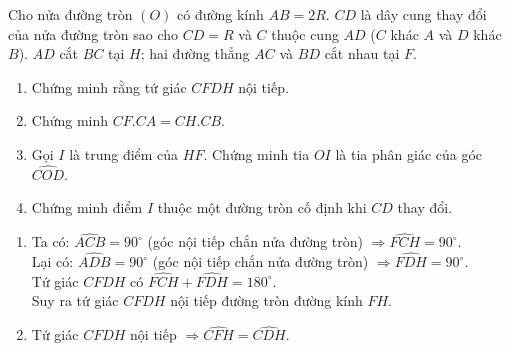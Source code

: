 \begin{ex}%
    Cho nửa đường tròn $(O)$ có đường kính $AB=2R$. $CD$ là dây cung thay đổi của nửa đường tròn sao cho $CD=R$ và $C$ thuộc cung $AD$ ($C$ khác $A$ và $D$ khác $B$). $AD$ cắt $BC$ tại $H$; hai đường thẳng $AC$ và $BD$ cắt nhau tại $F$.
    \begin{enumerate}
        \item Chứng minh rằng tứ giác $CFDH$ nội tiếp.
        \item Chứng minh $CF.CA=CH.CB$.
        \item Gọi $I$ là trung điểm của $HF$. Chứng minh tia $OI$ là tia phân giác của góc $\widehat{COD}$.
        \item Chứng minh điểm $I$ thuộc một đường tròn cố định khi $CD$ thay đổi.
    \end{enumerate}
\loigiai
    {
    \begin{center}
    \end{center}
    \begin{enumerate}
        \item Ta có: $\widehat{ACB} = 90^\circ$ (góc nội tiếp chắn nửa đường tròn) $\Rightarrow \widehat{FCH} = 90^\circ$.\\
        		Lại có: $\widehat{ADB} = 90^\circ$ (góc nội tiếp chắn nửa đường tròn) $\Rightarrow \widehat{FDH} = 90^\circ$.\\
        		Tứ giác $CFDH$ có $\widehat{FCH} + \widehat{FDH} = 180^\circ$.\\
        		Suy ra tứ giác $CFDH$ nội tiếp đường tròn đường kính $FH$.
        \item Tứ giác $CFDH$ nội tiếp $\Rightarrow \widehat{CFH} = \widehat{CDH}$.\\

\end{enumerate}}
\end{ex}
